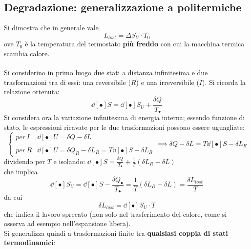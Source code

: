 \documentclass[10pt, oneside]{book}
\newcommand{\clausius}[2]{\frac{\delta Q_{#1}}{T_{#2}}}
\newcommand{\ds}{\displaystyle}
\begin{document}
\subsection{Degradazione: generalizzazione a politermiche}
Si dimostra che in generale vale
\[L_{lost} = \Delta S_U \cdot T_0\]
ove $T_0$ è la temperatura del termostato \textbf{più freddo} con cui la macchina termica scambia calore.\\~\\
Si considerino in primo luogo due stati a distanza infinitesima e due trasformazioni tra di essi: una reversibile ($R$) e una irreversibile ($I$). Si ricorda la relazione ottenuta:
\[\dd[•]{S} = \dd[•]{S}_U + \clausius{}{•}\]
Si considera ora la variazione infinitesima di energia interna; essendo funzione di stato, le espressioni ricavate per le due trasformazioni possono essere uguagliate:
\[\begin{cases} \displaystyle per \, I & \dd[•]{U} = \delta Q - \delta L  \\ \\ \displaystyle per \, R & \dd[•]{U} = \delta Q_R - \delta L_R = T \dd[•]{S} - \delta L_R
\end{cases}
\implies \delta Q - \delta L = T \dd[•]{S} - \delta L_R\]
dividendo per $T$ e isolando: $\ds \dd[•]{S} = \clausius{}{•} + \frac{1}{T}(\delta L_R - \delta L)$\\
che implica
\[\dd[•]{S}_U = \dd[•]{S} - \clausius{•}{•} = \frac{1}{T} (\delta L_R - \delta L) = \frac{\delta L_{lost}}{T}\]
da cui
\[\boxed{\delta L_{lost} = \dd[•]{S}_U \cdot T}\]
che indica il lavoro sprecato (non solo nel trasferimento del calore, come si osserva ad esempio nell'espansione libera).\\
Si generalizza quindi a trasformazioni finite tra \textbf{qualsiasi coppia di stati termodinamici}:
\end{document}
